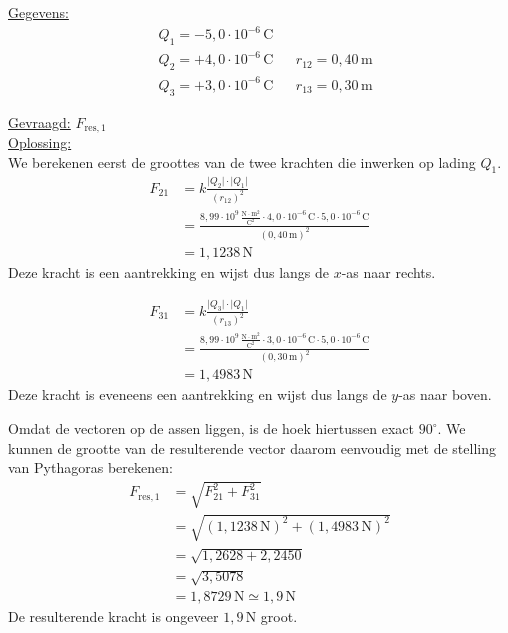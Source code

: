 \documentclass{ximera}
\begin{document}
\begin{exercise}
    \begin{solution}\nl
        \underline{Gegevens:}
        \begin{align*}
            & Q_{1} = -5{,}0 \cdot 10^{-6} \, \mathrm{C} & & \\
            & Q_{2} = +4{,}0 \cdot 10^{-6} \, \mathrm{C} & & r_{12} = 0{,}40 \, \mathrm{m}\\
            & Q_{3} = +3{,}0 \cdot 10^{-6} \, \mathrm{C} & & r_{13} = 0{,}30 \, \mathrm{m}
        \end{align*}

        \underline{Gevraagd:} $F_{\text{res},1}$\\ 

        \underline{Oplossing:}\\
        We berekenen eerst de groottes van de twee krachten die inwerken op lading $Q_{1}$.
        \begin{align*}
            F_{21} &= k\frac{\lvert Q_{2}\rvert\cdot\lvert Q_{1}\rvert}{(r_{12})^{2}} \\
            &= \frac{8{,}99 \cdot 10^9 \, \mathrm{\frac{N \cdot m^2}{C^2}} \cdot 4{,}0 \cdot 10^{-6} \, \mathrm{C} \cdot 5{,}0 \cdot 10^{-6} \, \mathrm{C}}{(0{,}40 \, \mathrm{m})^{2}} \\
            &= 1{,}1238 \, \mathrm{N}
        \end{align*}
        Deze kracht is een aantrekking en wijst dus langs de $x$-as naar rechts.
        
        \begin{align*}
            F_{31} &= k\frac{\lvert Q_{3}\rvert\cdot\lvert Q_{1}\rvert}{(r_{13})^{2}} \\
            &= \frac{8{,}99 \cdot 10^9 \, \mathrm{\frac{N \cdot m^2}{C^2}} \cdot 3{,}0 \cdot 10^{-6} \, \mathrm{C} \cdot 5{,}0 \cdot 10^{-6} \, \mathrm{C}}{(0{,}30 \, \mathrm{m})^{2}} \\
            &= 1{,}4983 \, \mathrm{N}
        \end{align*}
        Deze kracht is eveneens een aantrekking en wijst dus langs de $y$-as naar boven.

        Omdat de vectoren op de assen liggen, is de hoek hiertussen exact $90^\circ$. We kunnen de grootte van de resulterende vector daarom eenvoudig met de stelling van Pythagoras berekenen:
        \begin{align*}
            F_{\text{res},1} &= \sqrt{F_{21}^{2} + F_{31}^{2}} \\
            &= \sqrt{(1{,}1238 \, \mathrm{N})^{2} + (1{,}4983 \, \mathrm{N})^{2}} \\
            &= \sqrt{1{,}2628 + 2{,}2450} \\
            &= \sqrt{3{,}5078} \\
            &= 1{,}8729 \, \mathrm{N} \simeq 1{,}9 \, \mathrm{N}
        \end{align*}
        De resulterende kracht is ongeveer $1{,}9 \, \mathrm{N}$ groot.
    \end{solution}
\end{exercise}
\end{document}
